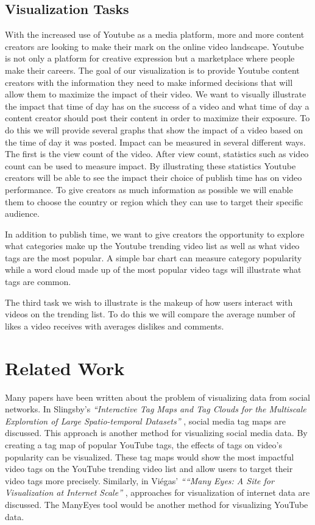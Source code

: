 \documentclass[journal]{vgtc}                %
\begin{document}
\subsection{Visualization Tasks}

With the increased use of Youtube as a media platform, more and more content creators are looking to make their mark on the online video landscape. Youtube is not only a platform for creative expression but a marketplace where people make their careers. The goal of our visualization is to provide Youtube content creators with the information they need to make informed decisions that will allow them to maximize the impact of their video. We want to visually illustrate the impact that time of day has on the success of a video and what time of day a content creator should post their content in order to maximize their exposure. To do this we will provide several graphs that show the impact of a video based on the time of day it was posted. Impact can be measured in several different ways. The first is the view count of the video. After view count, statistics such as video count can be used to measure impact. By illustrating these statistics Youtube creators will be able to see the impact their choice of publish time has on video performance. To give creators as much information as possible we will enable them to choose the country or region which they can use to target their specific audience.

In addition to publish time, we want to give creators the opportunity to explore what categories make up the Youtube trending video list as well as what video tags are the most popular. A simple bar chart can measure category popularity while a word cloud made up of the most popular video tags will illustrate what tags are common.

The third task we wish to illustrate is the makeup of how users interact with videos on the trending list. To do this we will compare the average number of likes a video receives with averages dislikes and comments.




\section{Related Work}
Many papers have been written about the problem of visualizing data from social networks. In Slingsby's \textit{“Interactive Tag Maps and Tag Clouds for the Multiscale Exploration of Large Spatio-temporal Datasets”} \cite{4272027},  social media tag maps are discussed.  This approach is another method for visualizing social media data. By creating a tag map of popular YouTube tags, the effects of tags on video's popularity can be visualized. These tag maps would show the most impactful video tags on the YouTube trending video list and allow users to target their video tags more precisely. Similarly, in Viégas' \textit{““Many Eyes: A Site for Visualization at Internet Scale”} \cite{4376131}, approaches for visualization of internet data are discussed. The ManyEyes tool would be another method for visualizing YouTube data.
\end{document}
